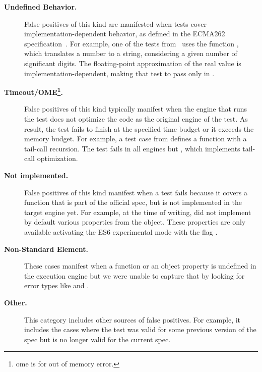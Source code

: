 \documentclass[smallextended]{svjour3}
\begin{document}
\begin{description}
  \item[\textbf{Undefined Behavior.}] False positives of this kind are
  manifested when tests cover implementation-dependent behavior, as
  defined in the ECMA262 specification~\cite{ecmas262-spec}. For
  example, one of the tests from \jerry\ uses the function
  , which translates a number to
  a string, considering a given number of significant digits. The
  floating-point approximation of the real value is
  implementation-dependent, making that test to pass only in
  \chakra.
  \item[\textbf{Timeout/OME\footnote{ome is for out of memory
      error.}.}] False positives of this kind typically manifest when the
     engine that runs the test does not optimize the code as the original
     engine of the test. As result, the test fails to finish at the
     specified time budget or it exceeds the memory budget. For example, a
     test case from \jsc defines a function with a tail-call
     recursion. The test fails in all engines but \jsc, which implements
     tail-call optimization.

  \item[\textbf{Not implemented.}] False positives of
this kind manifest when a test fails because it covers a function that
is part of the official spec, but is not implemented in the target
engine yet. For example, at the time of writing, \chakra{} did not
implement by default various properties from the 
object. These properties are only available activating the ES6
experimental mode with the flag .

\item[\textbf{Non-Standard Element.}] These cases manifest when a function or
an object property is undefined in the execution engine but we were
unable to capture that by looking for error types like
 and .

\item[\textbf{Other.}] This category
includes other sources of false positives. For example, it includes
the cases where the test was valid for some previous version of the
spec but is no longer valid for the current spec.

\end{description}
\end{document}
